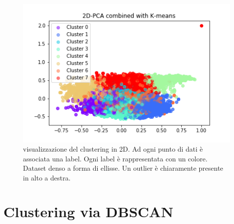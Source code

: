\documentclass[10pt,a4paper,twocolumn]{report}
\begin{document}
\begin{figure}[hbtp]
\centering 
\includegraphics[width=1\columnwidth]{../images/pca_kmeans.png}
\caption{visualizzazione del clustering in 2D. Ad ogni punto di dati è associata una label. Ogni label è rappresentata con un colore. Dataset denso a forma di ellisse. Un outlier è chiaramente presente in alto a destra.}
\label{fig:pca_kmeans}
\end{figure}

\section{Clustering via DBSCAN}
\end{document}
